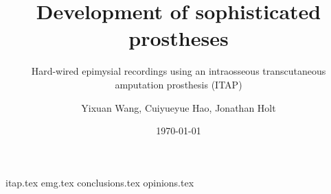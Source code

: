 \documentclass[final]{beamer}
\title{Development of sophisticated prostheses}
\subtitle{Hard-wired epimysial recordings using an intraosseous transcutaneous amputation prosthesis (ITAP)}
\author{Yixuan Wang, Cuiyueyue Hao, Jonathan Holt}
\date{\today}
\begin{document}
	\begin{frame}
		\titlepage
	\end{frame}

	{itap.tex}
	{emg.tex}
	{conclusions.tex}
	{opinions.tex}

	\begin{frame}
	\end{frame}
\end{document}
